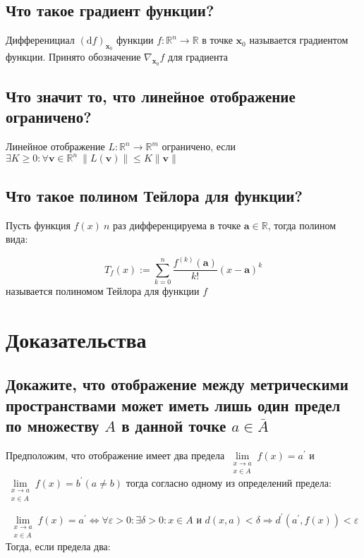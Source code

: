 \documentclass[a4paper]{article}
\begin{document}
\subsection{Что такое градиент функции?}

Дифференициал $(\mathrm{d} f)_{\mathbf{x}_{0}}$ функции $f: \mathbb{R}^{n} \rightarrow \mathbb{R}$ в точке $\mathbf{x}_{0}$ называется градиентом функции. Принято обозначение $\nabla_{\mathbf{x}_{0}} f$ для градиента

\subsection{Что значит то, что линейное отображение ограничено?}
Линейное отображение $L: \mathbb{R}^n\rightarrow\mathbb{R}^m$ ограничено, если $\exists K\geqslant0:\forall\mathbf{v}\in\mathbb{R}^n\ \|L(\mathbf{v})\|\leqslant K\|\mathbf{v}\|$
\subsection{Что такое полином Тейлора для функции?}

Пусть функция $f(x)\ n$ раз дифференцируема в точке $\mathbf{a} \in \mathbb{R}$, тогда полином вида:

$$
T_{f}(x):=\sum_{k=0}^{n} \frac{f^{(k)}(\mathbf{a})}{k !}(x-\mathbf{a})^{k}
$$
называется полиномом Тейлора для функции $f$

\newpage
\section{Доказательства}
\subsection{Докажите, что отображение между метрическими пространствами может иметь лишь один предел по множеству $A$ в данной точке $a \in \bar{A}$}

Предположим, что отображение имеет два предела $\lim\limits_{\substack{x \rightarrow a \\ x \in A}} f(x)=a^{\prime}$ и $\lim\limits_{\substack{x \rightarrow a \\ x \in A}} f(x)=b^{\prime}(a \neq b)$ тогда согласно одному из определений предела:

$$
\lim\limits_{\substack{x \rightarrow a \\ x \in A}} f(x)=a^{\prime} \Longleftrightarrow \forall \varepsilon>0: \exists \delta>0: x \in A \text { и } d(x, a)<\delta \Longrightarrow d^{\prime}\left(a^{\prime}, f(x)\right)<\varepsilon
$$
Тогда, если предела два:
\end{document}
